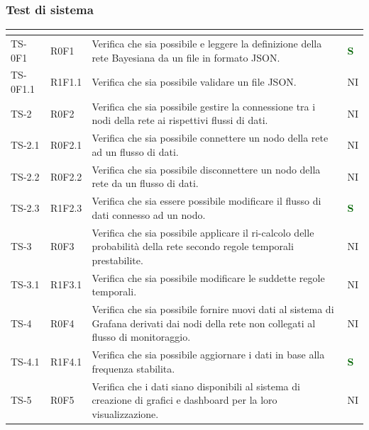 \subsubsection{Test di sistema}
\begin{longtable}{|C{2.5cm}|C{2.5cm}|C{6.5cm}|C{1.5cm}|}
			\hline
			\textbf{\color{title_text}{Test}} & \textbf{\color{title_text}{Requisito}} & \textbf{\color{title_text}{Descrizione}} & \textbf{\color{title_text}{Stato}} \\
			\hline
			\endhead
			{TS-0F1} & {R0F1} & Verifica che sia possibile e leggere la
			definizione della rete Bayesiana da un
			file in formato JSON.  & \textcolor{darkgreen}{\textbf{S}}\\
			\hline
			{TS-0F1.1} & {R1F1.1} & Verifica che sia possibile validare un
			file JSON. & {NI}\\
			\hline
			{TS-2} & {R0F2} & Verifica che sia possibile gestire la
			connessione tra i nodi della rete ai
			rispettivi flussi di dati. & {NI}\\
			\hline
			{TS-2.1} & {R0F2.1} & Verifica che sia possibile connettere un
			nodo della rete ad un flusso di dati. & {NI}\\
			\hline
			{TS-2.2} & {R0F2.2} & Verifica che sia possibile disconnettere un
			nodo della rete da un flusso di dati. & {NI}\\
			\hline
			{TS-2.3} & {R1F2.3} & Verifica che sia essere possibile modificare il
			flusso di dati connesso ad un nodo. & \textcolor{darkgreen}{\textbf{S}}\\
			\hline
			{TS-3} & {R0F3} & Verifica che sia possibile applicare il
			ri-calcolo delle probabilità della rete
			secondo regole temporali prestabilite. & {NI}\\
			\hline
			{TS-3.1} & {R1F3.1} & Verifica che sia possibile modificare le
			suddette regole temporali. & {NI}\\
			\hline
			{TS-4} & {R0F4} & Verifica che sia possibile fornire nuovi dati
			al sistema di Grafana derivati dai nodi
			della rete non collegati al flusso di
			monitoraggio. & {NI}\\
			\hline
			{TS-4.1} & {R1F4.1} & Verifica che sia possibile aggiornare i dati
			in base alla frequenza stabilita. & \textcolor{darkgreen}{\textbf{S}}\\
			\hline
			{TS-5} & {R0F5} & Verifica che i dati siano disponibili al sistema di
			creazione di grafici e dashboard per la
			loro visualizzazione. & {NI}\\
			\hline

\end{longtable}
